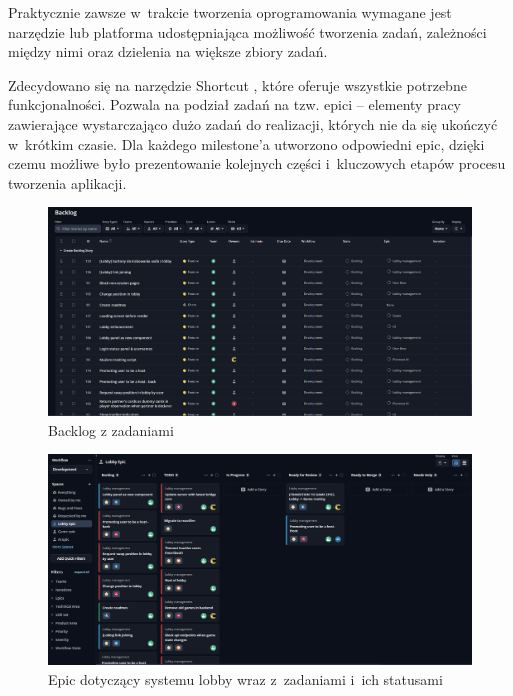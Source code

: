 Praktycznie zawsze w~trakcie tworzenia oprogramowania wymagane jest
narzędzie lub platforma udostępniająca możliwość tworzenia zadań,
zależności między nimi oraz dzielenia na większe zbiory zadań.

Zdecydowano się na narzędzie Shortcut \cite{Shortcut}, które oferuje
wszystkie potrzebne funkcjonalności. Pozwala na podział zadań na tzw.
epici -- elementy pracy zawierające wystarczająco dużo zadań do realizacji,
których nie da się ukończyć w~krótkim czasie. Dla każdego milestone'a
utworzono odpowiedni epic, dzięki czemu możliwe było prezentowanie
kolejnych części i~kluczowych etapów procesu tworzenia aplikacji.

\begin{figure}[h]
    \centering
    \includegraphics[width=\textwidth]{img/shortcut/shortcut_backlog.png}
    \caption{Backlog z zadaniami}
\end{figure}

\begin{figure}[h]
    \centering
    \includegraphics[width=\textwidth]{img/shortcut/shortcut_epic.png}
    \caption{Epic dotyczący systemu lobby wraz z~zadaniami i~ich statusami}
\end{figure}

\FloatBarrier


